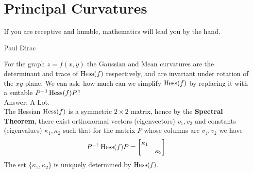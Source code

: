 
\section{Principal Curvatures}

\epigraph{If you are receptive and humble, mathematics will lead you by the hand.}{Paul Dirac}

For the graph $z=f(x,y)$ the Gaussian and Mean curvatures are the determinant and trace of $\operatorname{Hess}(f)$ respectively, and are invariant under rotation of the $xy$-plane. We can ask: how much can we simplify $\operatorname{Hess}(f)$ by replacing it with a suitable $P^{-1} \operatorname{Hess}(f) P$?\\ Answer: A Lot.\\

The Hessian $ \operatorname{Hess}(f)$ is a symmetric $ 2 \times 2$ matrix, hence by the \textbf{Spectral Theorem}, there exist orthonormal vectors (eigenvectors) $ v_1, v_2$ and constants (eigenvalues) $ \kappa_1, \kappa_2$ such that for the matrix $ P$ whose columns are $v_1, v_2$ we have
\begin{align}
	P^{-1} \operatorname{Hess}(f) P  = \begin{bmatrix} \kappa_1 & \\ & \kappa_2 \end{bmatrix}
\end{align}
The set $\{ \kappa_1, \kappa_2 \}$ is uniquely determined by $\operatorname{Hess}(f)$.

